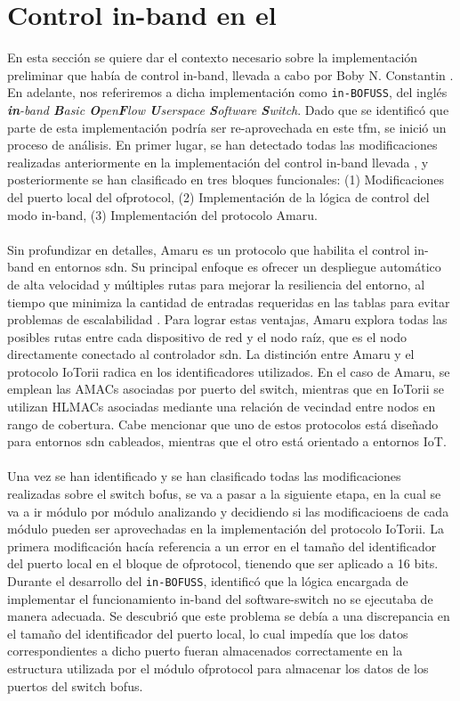 \section{Control in-band en el }
\label{sec:bofussDEV}

En esta sección se quiere dar el contexto necesario sobre la implementación preliminar que había de control in-band, llevada a cabo por Boby N. Constantin \cite{constantin2020desarrollo}. En adelante, nos referiremos a dicha implementación como \texttt{in-BOFUSS}, del inglés \textit{\textbf{in}-band \textbf{B}asic \textbf{O}pen\textbf{F}low \textbf{U}serspace \textbf{S}oftware \textbf{S}witch}. Dado que se identificó que parte de esta implementación podría ser re-aprovechada en este \gls{tfm}, se inició un proceso de análisis. En primer lugar, se han detectado todas las modificaciones realizadas anteriormente en la implementación del control in-band llevada , y posteriormente se han clasificado en tres bloques funcionales: (1) Modificaciones del puerto local del ofprotocol, (2) Implementación de la  lógica de control del modo in-band, (3) Implementación del protocolo Amaru.\\
\\
Sin profundizar en detalles, Amaru es un protocolo que habilita el control in-band en entornos \gls{sdn}. Su principal enfoque es ofrecer un despliegue automático de alta velocidad y múltiples rutas para mejorar la resiliencia del entorno, al tiempo que minimiza la cantidad de entradas requeridas en las tablas para evitar problemas de escalabilidad \cite{lopez2019amaru}. Para lograr estas ventajas, Amaru explora todas las posibles rutas entre cada dispositivo de red y el nodo raíz, que es el nodo directamente conectado al controlador \gls{sdn}. La distinción entre Amaru y el protocolo IoTorii radica en los identificadores utilizados. En el caso de Amaru, se emplean las AMACs asociadas por puerto del switch, mientras que en IoTorii se utilizan HLMACs asociadas mediante una relación de vecindad entre nodos en rango de cobertura. Cabe mencionar que uno de estos protocolos está diseñado para entornos \gls{sdn} cableados, mientras que el otro está orientado a entornos IoT.\\
\\
Una vez se han identificado y se han clasificado todas las modificaciones realizadas sobre el switch \gls{bofus}, se va a pasar a la siguiente etapa, en la cual se va a ir módulo por módulo analizando y decidiendo si las modificacioens de cada módulo pueden ser aprovechadas en la implementación del protocolo IoTorii. La primera modificación hacía referencia a un error en el tamaño del identificador del puerto local en el bloque de ofprotocol, tienendo que ser aplicado a 16 bits. Durante el desarrollo del \texttt{in-BOFUSS}, identificó que la lógica encargada de implementar el funcionamiento in-band del software-switch no se ejecutaba de manera adecuada. Se descubrió que este problema se debía a una discrepancia en el tamaño del identificador del puerto local, lo cual impedía que los datos correspondientes a dicho puerto fueran almacenados correctamente en la estructura utilizada por el módulo ofprotocol para almacenar los datos de los puertos del switch \gls{bofus}.\\
